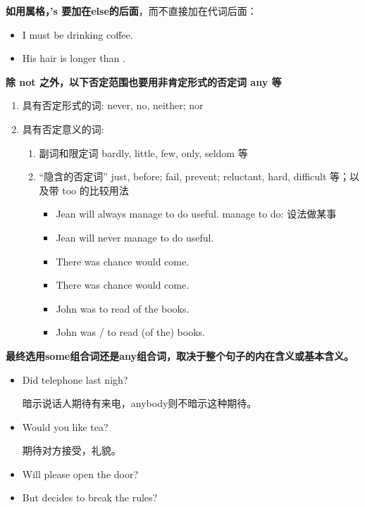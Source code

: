 \textbf{如用属格，'s 要加在else的后面}，而不直接加在代词后面：
\begin{itemize}
\item I must be drinking  coffee.
\item His hair is longer than .
\end{itemize}

\textbf{除 not 之外，以下否定范围也要用非肯定形式的否定词 any 等}
\begin{enumerate}
\item 具有否定形式的词: never, no, neither; nor
\item 具有否定意义的词:
  \begin{enumerate}
  \item 副词和限定词 bardly, little, few, only, seldom 等
  \item “隐含的否定词” just, before; fail, prevent; reluctant, hard, difficult
    等；以及带 too 的比较用法
    \begin{itemize}
    \item Jean will always manage to do  useful. manage to do:
      设法做某事
    \item Jean will never manage to do  useful.
    \item There was  chance  would come.
    \item There was  chance  would come.
    \item John was  to read  of the books.
    \item John was / to read  (of the) books.
    \end{itemize}
  \end{enumerate}
\end{enumerate}

\textbf{最终选用some组合词还是any组合词，取决于整个句子的内在含义或基本含义。}
\begin{itemize}
\item Did  telephone last nigh?

  暗示说话人期待有来电，anybody则不暗示这种期待。

\item Would you like  tea?

  期待对方接受，礼貌。

\item Will  please open the door?


\item But   decides to break the
  rules?
\end{itemize}

